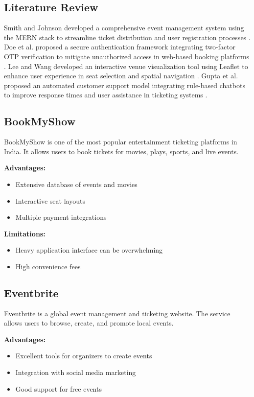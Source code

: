 \documentclass[12pt]{report}
\begin{document}
\subsection{Literature Review}
Smith and Johnson developed a comprehensive event management system using the MERN stack to streamline ticket distribution and user registration processes \cite{smith2023}. Doe et al. proposed a secure authentication framework integrating two-factor OTP verification to mitigate unauthorized access in web-based booking platforms \cite{doe2024}. Lee and Wang developed an interactive venue visualization tool using Leaflet to enhance user experience in seat selection and spatial navigation \cite{lee2023}. Gupta et al. proposed an automated customer support model integrating rule-based chatbots to improve response times and user assistance in ticketing systems \cite{gupta2025}.

\subsection{BookMyShow}
BookMyShow is one of the most popular entertainment ticketing platforms in India. It allows users to book tickets for movies, plays, sports, and live events.

\textbf{Advantages:}
\begin{itemize}
\item Extensive database of events and movies
\item Interactive seat layouts
\item Multiple payment integrations
\end{itemize}

\textbf{Limitations:}
\begin{itemize}
\item Heavy application interface can be overwhelming
\item High convenience fees
\end{itemize}

\subsection{Eventbrite}
Eventbrite is a global event management and ticketing website. The service allows users to browse, create, and promote local events.

\textbf{Advantages:}
\begin{itemize}
\item Excellent tools for organizers to create events
\item Integration with social media marketing
\item Good support for free events
\end{itemize}
\end{document}
